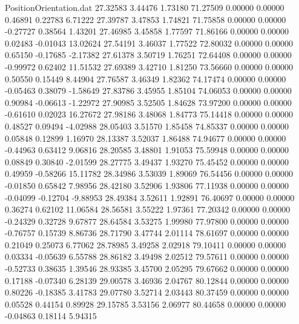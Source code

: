\begin{filecontents}{PositionOrientation.dat}
  27.32583    3.44476    1.73180    71.27509    0.00000    0.00000    0.46891    0.22783    6.71222
  27.39787    3.47853    1.74821    71.75858    0.00000    0.00000   -0.27727    0.38564    1.43201
  27.46985    3.45858    1.77597    71.86166    0.00000    0.00000    0.02483   -0.01043   13.02624
  27.54191    3.46037    1.77522    72.80032    0.00000    0.00000    0.65150   -0.17685   -2.17382
  27.61378    3.50719    1.76251    72.64408    0.00000    0.00000   -0.99972    0.62402   11.51532
  27.69389    3.42710    1.81250    73.56660    0.00000    0.00000    0.50550    0.15449    8.44904
  27.76587    3.46349    1.82362    74.17474    0.00000    0.00000   -0.05463    0.38079   -1.58649
  27.83786    3.45955    1.85104    74.06053    0.00000    0.00000    0.90984   -0.06613   -1.22972
  27.90985    3.52505    1.84628    73.97200    0.00000    0.00000   -0.61610    0.02023   16.27672
  27.98186    3.48068    1.84773    75.14418    0.00000    0.00000    0.48527    0.09494   -4.02988
  28.05403    3.51570    1.85458    74.85337    0.00000    0.00000    0.05848    0.12899    1.16970
  28.13387    3.52037    1.86488    74.94677    0.00000    0.00000   -0.44963    0.63412    9.06816
  28.20585    3.48801    1.91053    75.59948    0.00000    0.00000    0.08849    0.30840   -2.01599
  28.27775    3.49437    1.93270    75.45452    0.00000    0.00000    0.49959   -0.58266   15.11782
  28.34986    3.53039    1.89069    76.54456    0.00000    0.00000   -0.01850    0.65842    7.98956
  28.42180    3.52906    1.93806    77.11938    0.00000    0.00000   -0.04099   -0.12704   -9.88953
  28.49384    3.52611    1.92891    76.40697    0.00000    0.00000    0.36274    0.62102   11.06584
  28.56581    3.55222    1.97361    77.20342    0.00000    0.00000   -0.24329    0.32728    9.67877
  28.64584    3.53275    1.99980    77.97800    0.00000    0.00000   -0.76757    0.15739    8.86736
  28.71790    3.47744    2.01114    78.61697    0.00000    0.00000    0.21049    0.25073    6.77062
  28.78985    3.49258    2.02918    79.10411    0.00000    0.00000    0.03334   -0.05639    6.55788
  28.86182    3.49498    2.02512    79.57611    0.00000    0.00000   -0.52733    0.38635    1.39546
  28.93385    3.45700    2.05295    79.67662    0.00000    0.00000    0.17188   -0.07340    6.28139
  29.00578    3.46936    2.04767    80.12844    0.00000    0.00000    0.80226   -0.18385    3.41783
  29.07780    3.52714    2.03443    80.37459    0.00000    0.00000    0.05528    0.44154    0.89928
  29.15785    3.53156    2.06977    80.44658    0.00000    0.00000   -0.04863    0.18114    5.94315

\end{filecontents}
